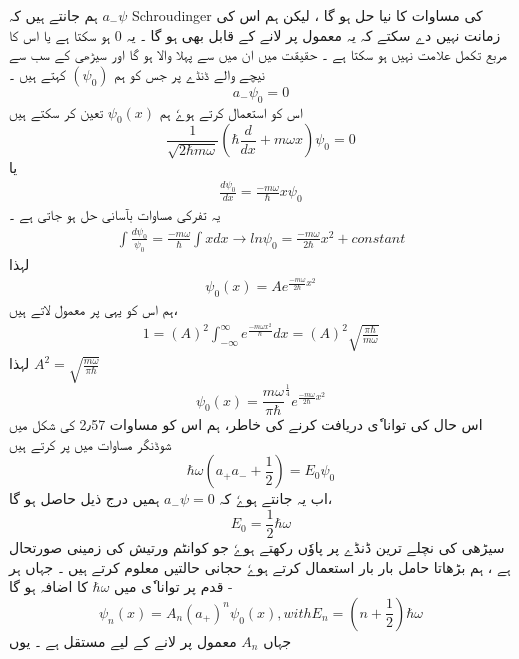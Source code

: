 ہم جانتے ہیں کہ 
$ a_- \psi $
Schroudinger  کی  مساوات کا نیا حل ہو گا  ، لیکن ہم اس کی زمانت نہیں دے سکتے  کہ یہ معمول پر لانے کے قابل بھی ہو گا ۔ یہ 0 ہو سکتا ہے  یا اس کا مربع تکمل علامت نہیں ہو سکتا ہے ۔ حقیقت میں ان میں سے پہلا والا ہو گا اور سیڑھی کے سب سے نیچے والے ڈنڈے پر جس کو ہم 
$ (\psi_0) $
کہتے ہیں ۔ 
\begin{equation}
 a_- \psi_0 = 0 
\end{equation}  
اس کو استعمال کرتے ہوےٗ ہم 
$ \psi_0 (x) $
تعین کر سکتے ہیں
$$\frac{1}{\sqrt{2 \hbar m \omega}} ( \hbar \frac{d}{dx} + m \omega x ) \psi_0 = 0 $$
\newpage 
یا
\begin{align}
\frac{ d  \psi_0}{ dx } = \frac{ - m \omega }{ \hbar } x \psi_0
\end{align}
یہ تفرکی مساوات بآسانی حل ہو جاتی ہے ۔ 
\begin{align}
\int{\frac{ d \psi_0 }{ \psi_0 } } = \frac{ - m \omega }{ \hbar } \int{ x dx } \rightarrow ln \psi_0 =  \frac{ - m \omega }{ 2 \hbar } x^2 + constant
\end{align} 
لہذا
\begin{align}
\psi_0 (x) = A e^{\frac{ - m \omega }{ 2 \hbar } x^2}
\end{align}
ہم اس کو یہی پر معمول لاتے ہیں، 
\begin{align}
1 = (A)^2 \int_{ - \infty}^{ \infty } e^\frac{ - m \omega x^2 }{ \hbar } dx = ( A )^2  \sqrt{ \frac{ \pi \hbar }{ m \omega }}
\end{align}
لہذا
$ A^2 = \sqrt{ \frac{ m \omega }{ \pi \hbar } } $
\\
\begin{equation}
\psi_0 (x) = \frac{ m \omega }{ \pi  \hbar}^\frac{1}{4} e^{\frac{ - m \omega }{ 2 \hbar} x^2}
\end{equation}
اس حال کی توانا ٗی دریافت کرنے کی خاطر، ہم اس کو مساوات 2٫57 کی شکل میں شوڈنگر مساوات میں پر کرتے ہیں 
$$ \hbar \omega (a_+ a_- + \frac{1}{2} ) = E_0 \psi_0  $$
اب یہ جانتے ہوےٗ کہ
$ a_- \psi = 0 $
ہمیں درج ذیل حاصل ہو گا،
\begin{equation}
 E_0 = \frac{1}{2} \hbar \omega 
\end{equation}
سیڑھی کی نچلے ترین ڈنڈے پر پاوٗں رکھتے ہوےٗ جو کوانٹم ورتیش کی زمینی صورتحال ہے ، ہم بڑھاتا حامل بار بار استعمال کرتے ہوےٗ حجانی حالتیں معلوم کرتے ہیں ۔ جہاں ہر قدم پر توانا ٗی میں 
$ \hbar \omega $
کا اضافہ ہو گا -
\begin{equation}
\psi_n (x) = A_n ( a_+)^n \psi_0(x) , with E_n = ( n + \frac{1}{2}) \hbar \omega
\end{equation}
جہاں
$ A_n $
معمول پر لانے کے لیے مستقل ہے ۔ یوں 
